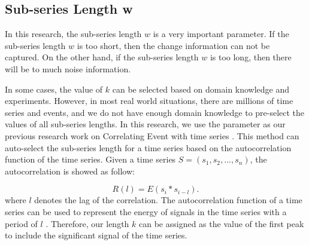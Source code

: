 \subsection{Sub-series Length w}

In this research, the sub-series length $w$ is a very important parameter.
If the sub-series length $w$ is too short, then the change information can not be captured. On the other hand, if the sub-series length $w$ is too long, then there will be to much noise information.

In some cases, the value of $k$ can be selected based on domain knowledge and experiments. However, in most real world situations, there are millions of time series and events, and we do not have enough domain knowledge to pre-select the values of all sub-series lengths. In this research, we use the parameter as our previous research work on Correlating Event with time series \cite{luo2014correlating}.
This method can auto-select the sub-series length for a time series based on the autocorrelation function \cite{hamilton1994time} of the time series.
Given a time series $S=(s_1,s_2,...,s_n)$, the autocorrelation is showed as follow:

\begin{equation}
R(l) = E(s_i*s_{i-l}).
\end{equation}
where $l$ denotes the lag of the correlation. The autocorrelation function of a time series can be used to represent the energy of signals in the time series with a period of $l$ \cite{hamilton1994time}. Therefore, our length $k$ can be assigned as the value of the first peak to include the significant signal of the time series. 
